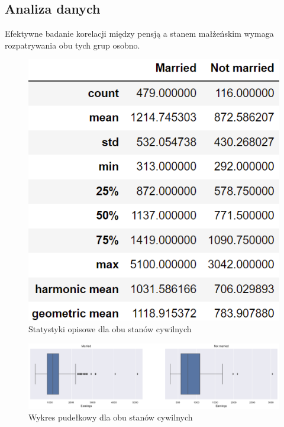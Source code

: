 \documentclass[12pt]{mwart}
\begin{document}
\subsection{Analiza danych}
\noindent Efektywne badanie korelacji między pensją a stanem małżeńskim wymaga rozpatrywania obu tych grup osobno. 

\begin{figure}[H]
	\begin{center}
	\includegraphics[scale=0.6]{compared2.png}
	\caption{Statystyki opisowe dla obu stanów cywilnych}
	\end{center}
\end{figure}

\begin{figure}[H]
	\begin{center}
	\includegraphics[scale=0.4]{boxplot2.pdf}
	\caption{Wykres pudełkowy dla obu stanów cywilnych}
	\end{center}
\end{figure}
\end{document}
